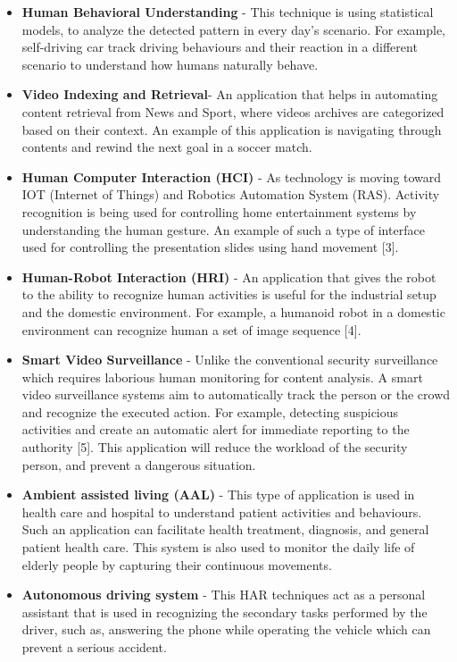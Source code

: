 \begin{itemize}
\item \textbf{Human Behavioral Understanding} - This technique is using statistical models, to analyze the detected pattern in every day's scenario. For example, self-driving car track driving behaviours and their reaction in a different scenario to understand how humans naturally behave.
\item \textbf{Video Indexing and Retrieval}- An application that helps in automating content retrieval from News and Sport, where videos archives are categorized based on their context. An example of this application is navigating through contents and rewind the next goal in a soccer match.
\item \textbf{Human Computer Interaction (HCI)} - As technology is moving toward IOT (Internet of Things) and Robotics Automation System (RAS). Activity recognition is being used for controlling home entertainment systems by understanding the human gesture. An example of such a type of interface used for controlling the presentation slides using hand movement [3].
\item \textbf{Human-Robot Interaction (HRI)} - An application that gives the robot to the ability to recognize human activities is useful for the industrial setup and the domestic environment. For example, a humanoid robot in a domestic environment can recognize human a set of image sequence [4]. 
\item \textbf{Smart Video Surveillance} - Unlike the conventional security surveillance which requires laborious human monitoring for content analysis. A smart video surveillance systems aim to automatically track the person or the crowd and recognize the executed action. For example, detecting suspicious activities and create an automatic alert for immediate reporting to the authority [5]. This application will reduce the workload of the security person, and prevent a dangerous situation.
\item \textbf{Ambient assisted living (AAL)} - This type of application is used in health care and hospital to understand patient activities and behaviours. Such an application can facilitate health treatment, diagnosis, and general patient health care. This system is also used to monitor the daily life of elderly people by capturing their continuous movements.
\item \textbf{Autonomous driving system} - This HAR techniques act as a personal assistant that is used in recognizing the secondary tasks performed by the driver, such as, answering the phone while operating the vehicle which can prevent a serious accident.  
\end{itemize}

